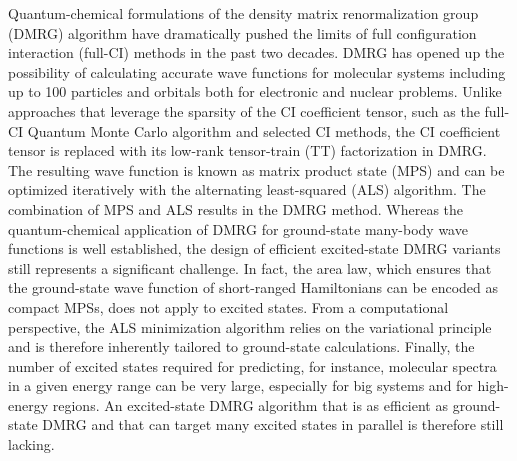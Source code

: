 \documentclass[journal=jctcce]{achemso}
\begin{document}
Quantum-chemical formulations of the density matrix renormalization group (DMRG) algorithm\cite{White1992_DMRGBasis,White1993_DMRGBasis,Legeza2008_Review,Chan2008_Review,Zgid2009_Review,Marti2010_Review-DMRG,Schollwoeck2011_Review-DMRG,Chan2011_Review,Wouters2013_Review,Kurashige2014_Review,Olivares2015_DMRGInPractice,Szalay2015_Review,Yanai2015,Knecht2016_Chimia,Freitag2020_BookChapter,Baiardi2020_Review} have dramatically pushed the limits of full configuration interaction (full-CI) methods in the past two decades.
DMRG has opened up the possibility of calculating accurate wave functions for molecular systems including up to 100 particles and orbitals both for electronic\cite{Marti2008_DMRGMetalComplexes,Kurashige2013_MnCaCluster-DMRG,Yanai2014_WaterReduction-DMRG,Sharma2014_IronSulfur-DMRG,Stein2017_AutoCAS-IrCatalysis} and nuclear\cite{Oseledts2016,Baiardi2017_VDMRG,Baiardi2019_HighEnergy-vDMRG,Muolo2020_NEAP-DMRG,Feldmann2021_ProtonDensities,Glaser2021_BookChapter} problems.
Unlike approaches that leverage the sparsity of the CI coefficient tensor, such as the full-CI Quantum Monte Carlo\cite{Alavi2009_FCIQMCOriginal,Alavi2011_Initiator-FCIQMC} algorithm and selected CI methods,\cite{Malrieu1973_CIPSI-Original,HeadGordon2016_SelectedCI,Schriber2016_AdaptiveCI,Sharma2017_HBCI,Sharma2018_Fast-HBCI,Berkelbach2021_HBCI-Vibrational} the CI coefficient tensor is replaced with its low-rank tensor-train (TT) factorization\cite{Kolda2009_TensorReview,Oseledets2012_ALS} in DMRG.
The resulting wave function is known as matrix product state (MPS)\cite{McCulloch2007_FromMPStoDMRG} and can be optimized iteratively with the alternating least-squared (ALS) algorithm.\cite{Oseledets2012_ALS} 
The combination of MPS and ALS results in the DMRG method.
Whereas the quantum-chemical application of DMRG for ground-state many-body wave functions is well established, the design of efficient excited-state DMRG variants still represents a significant challenge.
In fact, the area law\cite{Hastings2007_AreaLaw}, which ensures that the ground-state wave function of short-ranged Hamiltonians can be encoded as compact MPSs, does not apply to excited states.
From a computational perspective, the ALS minimization algorithm relies on the variational principle and is therefore inherently tailored to ground-state calculations.
Finally, the number of excited states required for predicting, for instance, molecular spectra in a given energy range can be very large, especially for big systems and for high-energy regions.
An excited-state DMRG algorithm that is as efficient as ground-state DMRG and that can target many excited states in parallel is therefore still lacking.
\end{document}
